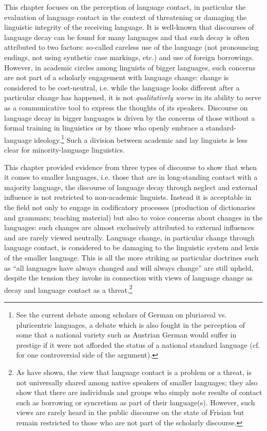 \documentclass[output=paper]{langsci/langscibook}
\begin{document}
This chapter focuses on the perception of language contact, in particular the evaluation of language contact in the context of threatening or damaging the linguistic integrity of the receiving language. It is well-known that discourses of language decay can be found for many languages and that such decay is often attributed to two factors: so-called careless use of the language (not pronouncing endings, not using synthetic case markings, etc.) and use of foreign borrowings. However, in academic circles among linguists of bigger languages, such concerns are not part of a scholarly engagement with language change: change is considered to be cost-neutral, i.e. while the language looks different after a particular change has happened, it is not \textit{qualitatively worse} in its ability to serve as a communicative tool to express the thoughts of its speakers. Discourse on language decay in bigger languages is driven by the concerns of those without a formal training in linguistics or by those who openly embrace a standard-language ideology.\footnote{See the current debate among scholars of German on pluriareal vs. pluricentric languages, a debate which is also fought in the perception of some that a national variety such as Austrian German would suffer in prestige if it were not afforded the status of a national standard language (cf. \citealt{Dollinger2019} for one controversial side of the argument).} Such a division between academic and lay linguists is less clear for minority-language linguistics.\par This chapter provided evidence from three types of discourse to show that when it comes to smaller languages, i.e. those that are in long-standing contact with a majority language, the discourse of language decay through neglect and external influence is not restricted to non-academic linguists. Instead it is acceptable in the field not only to engage in codificatory processes (production of dictionaries and grammars; teaching material) but also to voice concerns about changes in the languages: such changes are almost exclusively attributed to external influences and are rarely viewed neutrally. Language change, in particular change through language contact, is considered to be damaging to the linguistic system and lexis of the smaller language. This is all the more striking as particular doctrines such as “all languages have always changed and will always change” are still upheld, despite the tension they invoke in connection with views of language change as decay and language contact as a threat.\footnote{As \citet{AdmiraalEtAl2019} have shown, the view that language contact is a problem or a threat, is not universally shared among native speakers of smaller languages; they also show that there are individuals and groups who simply note results of contact such as borrowing or syncretism as part of their language(s). However, such views are rarely heard in the public discourse on the state of Frisian but remain restricted to those who are not part of the scholarly discourse.}
\end{document}
